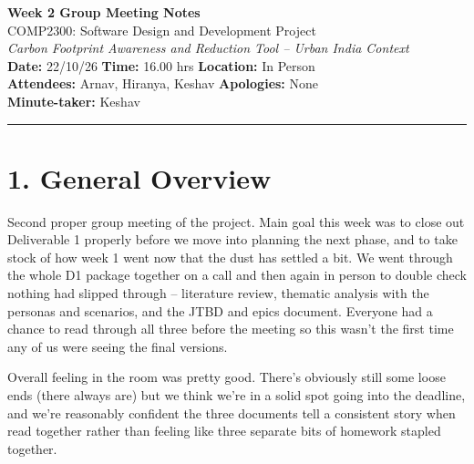 \documentclass[11pt,a4paper]{article}
\begin{document}
\begin{center}
    {\LARGE \textbf{Week 2 Group Meeting Notes}}\\[4pt]
    {\large COMP2300: Software Design and Development Project}\\[2pt]
    \textit{Carbon Footprint Awareness and Reduction Tool -- Urban India Context}\\[10pt]
    \textbf{Date:} 22/10/26 \quad \textbf{Time:} 16.00 hrs \quad \textbf{Location:} In Person\\
    \textbf{Attendees:} Arnav, Hiranya, Keshav \quad \textbf{Apologies:} None\\
    \textbf{Minute-taker:} Keshav
\end{center}

\vspace{10pt}
\hrule
\vspace{14pt}

\section*{1. General Overview}

Second proper group meeting of the project. Main goal this week was to close out Deliverable 1 properly before we move into planning the next phase, and to take stock of how week 1 went now that the dust has settled a bit. We went through the whole D1 package together on a call and then again in person to double check nothing had slipped through -- literature review, thematic analysis with the personas and scenarios, and the JTBD and epics document. Everyone had a chance to read through all three before the meeting so this wasn't the first time any of us were seeing the final versions.

Overall feeling in the room was pretty good. There's obviously still some loose ends (there always are) but we think we're in a solid spot going into the deadline, and we're reasonably confident the three documents tell a consistent story when read together rather than feeling like three separate bits of homework stapled together.

\vspace{6pt}
\end{document}
